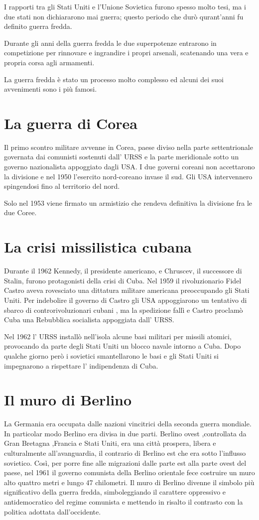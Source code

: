 I rapporti tra gli Stati Uniti e l'Unione Sovietica furono spesso molto tesi, ma i due stati non dichiararono mai guerra; questo periodo che durò qurant'anni fu definito guerra fredda.

Durante gli anni della guerra fredda le due superpotenze entrarono in competizione per rinnovare e ingrandire i propri arsenali, scatenando una vera e propria corsa agli armamenti.

\noindent
La guerra fredda è stato un processo molto complesso ed alcuni dei suoi avvenimenti sono i più famosi.

\section{La guerra di Corea}
Il primo scontro militare avvenne in Corea, paese diviso nella parte settentrionale governata dai comunisti sostenuti dall’ URSS e la parte meridionale sotto un governo nazionalista appoggiato dagli USA. I due governi coreani non accettarono la divisione e nel 1950 l’esercito nord-coreano invase il sud. Gli USA intervennero spingendosi fino al territorio del nord.

\noindent
Solo nel 1953 viene firmato un armistizio che rendeva definitiva la divisione fra le due Coree.

\section{La crisi missilistica cubana}
Durante il 1962 Kennedy, il presidente americano, e Chruscev, il successore di Stalin, furono protagonisti della crisi di Cuba. Nel 1959 il rivoluzionario Fidel Castro aveva rovesciato una dittatura militare americana preoccupando gli Stati Uniti. Per indebolire il governo di Castro gli USA appoggiarono un tentativo di sbarco di controrivoluzionari cubani , ma la spedizione fallì e Castro proclamò Cuba una Rebubblica socialista appoggiata dall’ URSS.

Nel 1962 l’ URSS installò nell’isola alcune basi militari per missili atomici, provocando da parte degli Stati Uniti un blocco navale intorno a Cuba. Dopo qualche giorno però i sovietici smantellarono le basi e gli Stati Uniti si impegnarono a rispettare l’ indipendenza di Cuba.

\section{Il muro di Berlino}
La Germania era occupata dalle nazioni vincitrici della seconda guerra mondiale. In particolar modo Berlino era divisa in due parti. Berlino ovest ,controllata da Gran Bretagna ,Francia e Stati Uniti, era una città prospera, libera e culturalmente all’avanguardia, il contrario di Berlino est che era sotto l’influsso sovietico. Così, per porre fine alle migrazioni dalle parte est alla parte ovest del paese, nel 1961 il governo comunista della Berlino orientale fece costruire un muro alto quattro metri e lungo 47 chilometri. Il muro di Berlino divenne il simbolo più significativo della guerra fredda, simboleggiando il carattere oppressivo e antidemocratico del regime comunista e mettendo in risalto il contrasto con la politica adottata dall'occidente.
